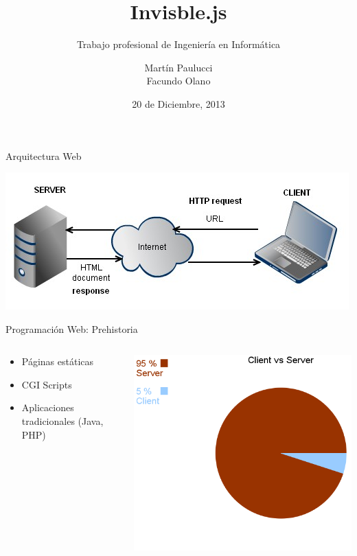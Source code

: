 \documentclass[xcolor=dvipsnames, 14pt]{beamer}
\title{Invisble.js}
\subtitle{Trabajo profesional de Ingeniería en Informática}
\author{
Martín Paulucci \\
Facundo Olano
}
\institute[UMBC]{
  Facultad de Ingeniería\\
  Universidad de Buenos Aires \\
}
\date{20 de Diciembre, 2013}
\begin{document}
\begin{frame}[plain]
  \titlepage
\end{frame}

\begin{frame}{Arquitectura Web}
    \begin{center}
        \includegraphics[width=\textwidth]{img/http.png}
    \end{center}
\end{frame}


\begin{frame}{Programación Web: Prehistoria}
    \begin{columns}[c]
        \begin{column}{0.5\textwidth}
            \begin{itemize}
                \item Páginas estáticas
                \item CGI Scripts
                \item Aplicaciones tradicionales (Java, PHP)
            \end{itemize}
        \end{column}
        \begin{column}{0.5\textwidth}
            \begin{center}
                \includegraphics[width=\textwidth]{img/prehistoria2.png}
            \end{center}
        \end{column}
    \end{columns}
\end{frame}
\end{document}
